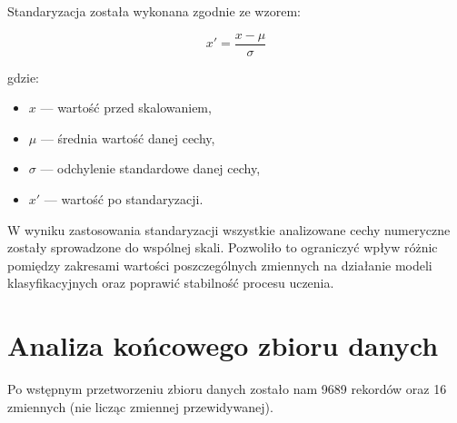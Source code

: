 \documentclass[twoside]{customStyle}
\begin{document}
Standaryzacja została wykonana zgodnie ze wzorem:

\begin{equation}
x' = \frac{x - \mu}{\sigma}
\end{equation}

gdzie:
\begin{itemize}
	\item $x$ --- wartość przed skalowaniem,
	\item $\mu$ --- średnia wartość danej cechy,
	\item $\sigma$ --- odchylenie standardowe danej cechy,
	\item $x'$ --- wartość po standaryzacji.
\end{itemize}

W wyniku zastosowania standaryzacji wszystkie analizowane cechy numeryczne zostały sprowadzone do wspólnej skali. Pozwoliło to ograniczyć wpływ różnic pomiędzy zakresami wartości poszczególnych zmiennych na działanie modeli klasyfikacyjnych oraz poprawić stabilność procesu uczenia.


\section{Analiza końcowego zbioru danych}
Po wstępnym przetworzeniu zbioru danych zostało nam 9689 rekordów oraz 16 zmiennych (nie licząc zmiennej przewidywanej).
\end{document}
